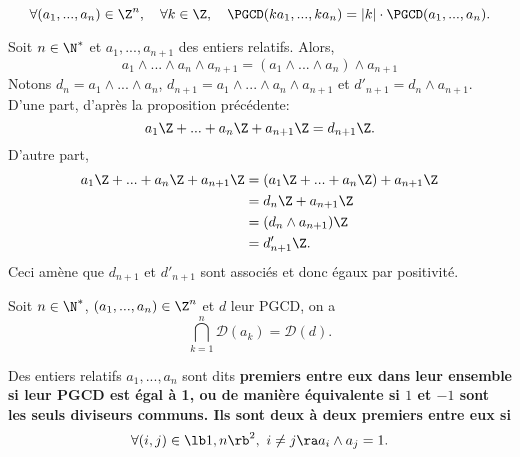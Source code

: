 \documentclass[11pt]{article}
\renewcommand*{\D}{\mathcal{D}}
\begin{document}
\begin{prop}{}{}
    \begin{equation*}
        \forall (a_1,...,a_n)\in\Z^n, \quad \forall k \in \Z, \quad \PGCD(ka_1,...,ka_n)=|k|\cdot\PGCD(a_1,...,a_n).
    \end{equation*}
\end{prop}

\begin{prop}{}{}
    Soit $n\in\N^*$ et $a_1,...,a_{n+1}$ des entiers relatifs. Alors,
    \begin{equation*}
        a_1\land...\land a_n\land a_{n+1}=(a_1\land ... \land a_n) \land a_{n+1}
    \end{equation*}
    \tcblower
    Notons $d_n=a_1\land ... \land a_n$, $d_{n+1}=a_1\land...\land a_n \land a_{n+1}$ et $d'_{n+1}=d_n\land a_{n+1}$.\\
    D'une part, d'après la proposition précédente:
    \begin{equation*}
        a_1\Z+...+a_n\Z+a_{n+1}\Z=d_{n+1}\Z.
    \end{equation*}
    D'autre part,
    \begin{align*}
        a_1\Z+...+a_n\Z+a_{n+1}\Z&=(a_1\Z+...+a_n\Z)+a_{n+1}\Z\\
        &=d_n\Z+a_{n+1}\Z\\
        &=(d_n\land a_{n+1})\Z\\
        &= d'_{n+1}\Z.
    \end{align*}
    Ceci amène que $d_{n+1}$ et $d'_{n+1}$ sont associés et donc égaux par positivité.
\end{prop}

\begin{prop}{}{}
    Soit $n\in\N^*$, $(a_1,...,a_n)\in\Z^n$ et $d$ leur PGCD, on a
    \begin{equation*}
        \bigcap_{k=1}^n\D(a_k)=\D(d).
    \end{equation*}
\end{prop}

\begin{defi}{}{}
    Des entiers relatifs $a_1,...,a_n$ sont dits \bf{premiers entre eux dans leur ensemble} si leur PGCD est égal à 1, ou de manière équivalente si $1$ et $-1$ sont les seuls diviseurs communs.\n
    Ils sont \bf{deux à deux premiers entre eux} si
    \begin{equation*}
        \forall (i,j) \in \lb1,n\rb^2, ~ i \neq j \ra a_i \land a_j = 1.
    \end{equation*}
\end{defi}
\end{document}
